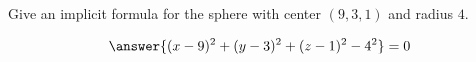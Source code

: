 \documentclass{ximera}
\author{Bart Snapp}
\begin{document}
\begin{exercise}
  Give an implicit formula for the sphere with center $(9,3,1)$ and radius $4$.
  \begin{prompt}
  \[
  \answer{(x-9)^2 + (y-3)^2 + (z-1)^2-4^2}=0
  \]
  \end{prompt}
\end{exercise}
\end{document}
